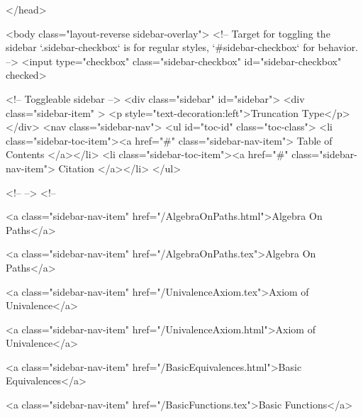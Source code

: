   
</head>




  <body class="layout-reverse sidebar-overlay">
    <!-- Target for toggling the sidebar `.sidebar-checkbox` is for regular
     styles, `#sidebar-checkbox` for behavior. -->
<input type="checkbox" class="sidebar-checkbox" id="sidebar-checkbox" checked>

<!-- Toggleable sidebar -->
<div class="sidebar" id="sidebar">
  <div class="sidebar-item" >
    <p style="text-decoration:left">Truncation Type</p>
  </div>
  <nav class="sidebar-nav">
    <ul id="toc-id" class="toc-class">
  <li class="sidebar-toc-item"><a href="#" class="sidebar-nav-item"> Table of Contents </a></li>
  <li class="sidebar-toc-item"><a href="#" class="sidebar-nav-item"> Citation </a></li>
</ul>


    <!--  -->
    <!-- 
      
    
      
    
      
    
      
    
      
        
      
    
      
        
          <a class="sidebar-nav-item" href="/AlgebraOnPaths.html">Algebra On Paths</a>
        
      
    
      
        
          <a class="sidebar-nav-item" href="/AlgebraOnPaths.tex">Algebra On Paths</a>
        
      
    
      
        
          <a class="sidebar-nav-item" href="/UnivalenceAxiom.tex">Axiom of Univalence</a>
        
      
    
      
        
          <a class="sidebar-nav-item" href="/UnivalenceAxiom.html">Axiom of Univalence</a>
        
      
    
      
        
          <a class="sidebar-nav-item" href="/BasicEquivalences.html">Basic Equivalences</a>
        
      
    
      
        
          <a class="sidebar-nav-item" href="/BasicFunctions.tex">Basic Functions</a>
        
